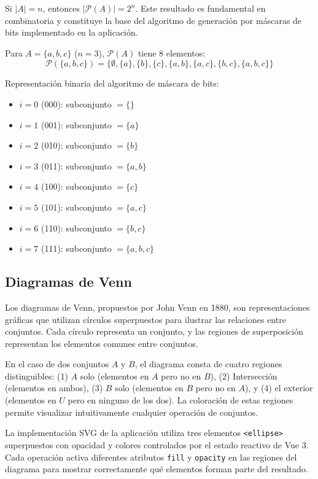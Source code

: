 \documentclass[11pt,a4paper]{article}
\begin{document}
Si $|A| = n$, entonces $|\mathcal{P}(A)| = 2^n$. Este resultado es fundamental en combinatoria y constituye la base del algoritmo de generación por máscaras de bits implementado en la aplicación.

Para $A = \{a, b, c\}$ ($n=3$), $\mathcal{P}(A)$ tiene 8 elementos:
\begin{equation}
\mathcal{P}(\{a,b,c\}) = \{ \emptyset, \{a\}, \{b\}, \{c\}, \{a,b\}, \{a,c\}, \{b,c\}, \{a,b,c\} \}
\end{equation}

Representación binaria del algoritmo de máscara de bits:
\begin{itemize}[noitemsep]
    \item $i=0$ (000): subconjunto $= \{\}$
    \item $i=1$ (001): subconjunto $= \{a\}$
    \item $i=2$ (010): subconjunto $= \{b\}$
    \item $i=3$ (011): subconjunto $= \{a,b\}$
    \item $i=4$ (100): subconjunto $= \{c\}$
    \item $i=5$ (101): subconjunto $= \{a,c\}$
    \item $i=6$ (110): subconjunto $= \{b,c\}$
    \item $i=7$ (111): subconjunto $= \{a,b,c\}$
\end{itemize}

\subsection{Diagramas de Venn}
Los diagramas de Venn, propuestos por John Venn en 1880, son representaciones gráficas que utilizan círculos superpuestos para ilustrar las relaciones entre conjuntos. Cada círculo representa un conjunto, y las regiones de superposición representan los elementos comunes entre conjuntos.

En el caso de dos conjuntos $A$ y $B$, el diagrama consta de cuatro regiones distinguibles: (1) $A$ solo (elementos en $A$ pero no en $B$), (2) Intersección (elementos en ambos), (3) $B$ solo (elementos en $B$ pero no en $A$), y (4) el exterior (elementos en $U$ pero en ninguno de los dos). La coloración de estas regiones permite visualizar intuitivamente cualquier operación de conjuntos.

La implementación SVG de la aplicación utiliza tres elementos \texttt{<ellipse>} superpuestos con opacidad y colores controlados por el estado reactivo de Vue 3. Cada operación activa diferentes atributos \texttt{fill} y \texttt{opacity} en las regiones del diagrama para mostrar correctamente qué elementos forman parte del resultado.
\end{document}
